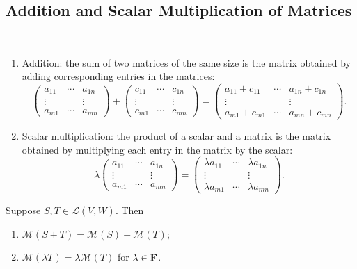\subsection{Addition and Scalar Multiplication of Matrices}
\begin{definition} \
\begin{enumerate}[label=(\roman*)]
\item Addition: the sum of two matrices of the same size is the matrix obtained by adding corresponding entries in the matrices:
\[\begin{pmatrix}
a_{11}&\cdots&a_{1n}\\
\vdots&&\vdots\\
a_{m1}&\cdots&a_{mn}
\end{pmatrix}+
\begin{pmatrix}
c_{11}&\cdots&c_{1n}\\
\vdots&&\vdots\\
c_{m1}&\cdots&c_{mn}
\end{pmatrix}=
\begin{pmatrix}
a_{11}+c_{11}&\cdots&a_{1n}+c_{1n}\\
\vdots&&\vdots\\
a_{m1}+c_{m1}&\cdots&a_{mn}+c_{mn}
\end{pmatrix}.\]

\item Scalar multiplication: the product of a scalar and a matrix is the matrix obtained by multiplying each entry in the matrix by the scalar:
\[\lambda\begin{pmatrix}
a_{11}&\cdots&a_{1n}\\
\vdots&&\vdots\\
a_{m1}&\cdots&a_{mn}
\end{pmatrix}=
\begin{pmatrix}
\lambda a_{11}&\cdots&\lambda a_{1n}\\
\vdots&&\vdots\\
\lambda a_{m1}&\cdots&\lambda a_{mn}
\end{pmatrix}.\]
\end{enumerate}
\end{definition}

\begin{proposition}
Suppose $S,T\in\mathcal{L}(V,W)$. Then
\begin{enumerate}[label=(\roman*)]
\item $\mathcal{M}(S+T)=\mathcal{M}(S)+\mathcal{M}(T)$;
\item $\mathcal{M}(\lambda T)=\lambda\mathcal{M}(T)$ for $\lambda\in\mathbf F$.
\end{enumerate}
\end{proposition}

